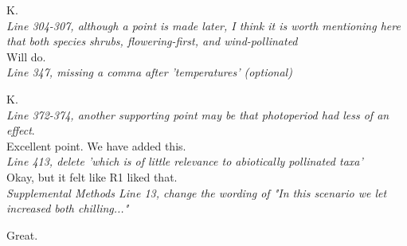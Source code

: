 \documentclass[11pt]{article}
\begin{document}
K.\\

\emph{Line 304-307, although a point is made later, I think it is worth mentioning here that both species shrubs, flowering-first, and wind-pollinated}\\

Will do.\\

\emph{Line 347, missing a comma after 'temperatures' (optional)}

K.\\

\emph{Line 372-374, another supporting point may be that photoperiod had less of an effect}.\\

Excellent point. We have added this.\\


\emph{Line 413, delete 'which is of little relevance to abiotically pollinated taxa'}\\

Okay, but it felt like R1 liked that.\\

\emph{Supplemental Methods Line 13, change the wording of "In this scenario we let increased both chilling..."}

Great.\\
\end{document}
